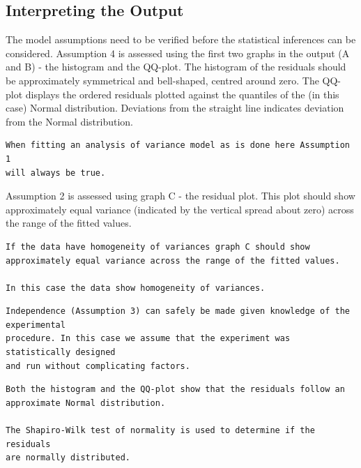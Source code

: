 \documentclass[a4paper, 10pt, fleqn, twosided]{memoir}
\begin{document}
\clearpage
\subsection{Interpreting the Output}

The model assumptions need to be verified before the statistical inferences can be considered. Assumption 4 is assessed
using the first two graphs in the output (A and B) - the histogram and the QQ-plot. The histogram of the residuals
should be approximately symmetrical and bell-shaped, centred around zero. The QQ-plot displays the ordered residuals
plotted against the quantiles of the (in this case) Normal distribution. Deviations from the straight line indicates
deviation from the Normal distribution.

\begin{tcolorbox}[title = Example 3 Assumption 1]
\begin{verbatim}
When fitting an analysis of variance model as is done here Assumption 1
will always be true.
\end{verbatim}
\end{tcolorbox}


Assumption 2 is assessed using graph C - the residual plot. This plot should show approximately equal variance
(indicated by the vertical spread about zero) across the range of the fitted values.

\begin{tcolorbox}[title = Example 3 Assumption 2]
\begin{verbatim}
If the data have homogeneity of variances graph C should show
approximately equal variance across the range of the fitted values.

In this case the data show homogeneity of variances.
\end{verbatim}
\end{tcolorbox}

\begin{tcolorbox}[title = Example 3 Assumption 3]
\begin{verbatim}
Independence (Assumption 3) can safely be made given knowledge of the experimental
procedure. In this case we assume that the experiment was statistically designed
and run without complicating factors.
\end{verbatim}
\end{tcolorbox}

\begin{tcolorbox}[title = Example 3 Assumption 4]
\begin{verbatim}
Both the histogram and the QQ-plot show that the residuals follow an
approximate Normal distribution.

The Shapiro-Wilk test of normality is used to determine if the residuals
are normally distributed.
\end{verbatim}
\end{tcolorbox}
\end{document}
